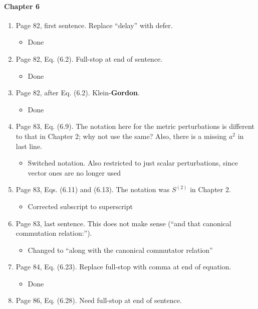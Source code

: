 \documentclass[11pt]{article}
\begin{document}
\paragraph{Chapter 6}
\begin{enumerate}
\item Page 82, first sentence. Replace ``delay'' with defer.
    \begin{itemize}
        \item Done
    \end{itemize}
\item Page 82, Eq. (6.2). Full-stop at end of sentence.
    \begin{itemize}
        \item Done
    \end{itemize}
\item Page 82, after Eq. (6.2). Klein-\textbf{Gordon}.
    \begin{itemize}
        \item Done
    \end{itemize}
\item Page 83, Eq. (6.9). The notation here for the metric
  perturbations is different to that in
  Chapter 2; why not use the same? Also, there is a missing $a^2$ in
  last line.
  \begin{itemize}
      \item Switched notation. Also restricted to just scalar perturbations, since vector ones are no longer used
  \end{itemize}
\item Page 83, Eqs. (6.11) and (6.13). The notation was $S^{(2)}$ in
  Chapter 2.
  \begin{itemize}
      \item Corrected subscript to superscript
  \end{itemize}
\item Page 83, last sentence. This does not make sense (``and that
  canonical commutation relation:'').
  \begin{itemize}
      \item Changed to ``along with the canonical commutator relation''
  \end{itemize}
\item Page 84, Eq. (6.23). Replace full-stop with comma at end of
  equation.
  \begin{itemize}
      \item Done
  \end{itemize}
\item Page 86, Eq. (6.28). Need full-stop at end of sentence.

\end{enumerate}
\end{document}
